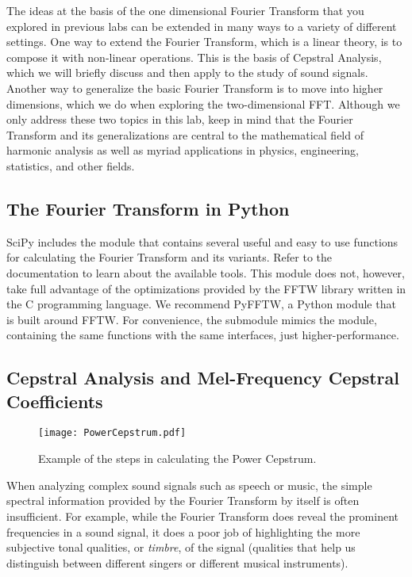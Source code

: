 
The ideas at the basis of the one dimensional Fourier Transform that you explored in previous labs can be
extended in many ways to a variety of different settings. One way to extend the Fourier Transform, which is
a linear theory, is to compose it with non-linear operations. This is the basis of Cepstral Analysis, which we
will briefly discuss and then apply to the study of sound signals. Another way to generalize the basic
Fourier Transform is to move into higher dimensions, which we do when exploring the two-dimensional FFT.
Although we only address these two topics in this lab, keep in mind that the Fourier Transform and its
generalizations are central to the mathematical field of harmonic analysis as well as myriad applications
in physics, engineering, statistics, and other fields.

\subsection*{The Fourier Transform in Python}
SciPy includes the module  that contains several useful and easy to use functions
for calculating the Fourier Transform and its variants. Refer to the documentation to learn about
the available tools. This module does not, however, take full advantage of the optimizations provided
by the FFTW library written in the C programming language. We recommend PyFFTW, a Python module that
is built around FFTW. For convenience, the submodule  mimics the
 module, containing the same functions with the same interfaces, just higher-performance.

\subsection*{Cepstral Analysis and Mel-Frequency Cepstral Coefficients}
\begin{figure}
\centering
\texttt{[image: PowerCepstrum.pdf]}
\caption{Example of the steps in calculating the Power Cepstrum.}
\label{fourierext:pc}
\end{figure}
When analyzing complex sound signals such as speech or music, the simple spectral information provided by
the Fourier Transform by itself is often insufficient. For example, while the Fourier Transform does reveal
the prominent frequencies in a sound signal, it does a poor job of highlighting the more subjective
tonal qualities, or \emph{timbre}, of the signal (qualities that help us distinguish between different singers
or different musical instruments).

